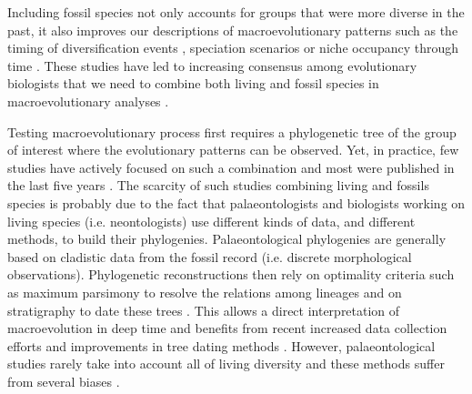 Including fossil species not only accounts for groups that were more diverse in the past, it also improves our descriptions of macroevolutionary patterns such as the timing of diversification events \citep[e.g. significantly reducing node age confidence intervals;][]{ronquista2012}, speciation scenarios \citep[e.g. revealing hidden vicariance patterns;][]{Wood01032013} or niche occupancy through time \citep[e.g.][]{pearmanniche2008}.
These studies have led to increasing consensus among evolutionary biologists that we need to combine both living and fossil species in macroevolutionary analyses \citep{jacksonwhat2006,quentaldiversity2010,dietlconservation2011,slaterunifying2013,fritzdiversity2013,benton2015}.


Testing macroevolutionary process first requires a phylogenetic tree of the group of interest where the evolutionary patterns can be observed.
Yet, in practice, few studies have actively focused on such a combination and most were published in the last five years \citep[e.g.][]{ronquista2012,slaterphylogenetic2013,Wood01032013,beckancient2014}.
The scarcity of such studies combining living and fossils species is probably due to the fact that palaeontologists and biologists working on living species (i.e. neontologists) %
use different kinds of data, and different methods, to build their phylogenies.
Palaeontological phylogenies are generally based on cladistic data from the fossil record (i.e. discrete morphological observations).
Phylogenetic reconstructions then rely on optimality criteria such as maximum parsimony \citep{Hennig1966,felsenstein2004} to resolve the relations among lineages and on stratigraphy to date these trees \citep{GoloboffTNT}.
This allows a direct interpretation of macroevolution in deep time and benefits from recent increased data collection efforts \citep[e.g. 4541 characters in][introducing the term ``phenomics'']{O'Leary08022013} and improvements in tree dating methods \citep[e.g. the \textit{cal3} method from][]{Bapst2014}.
However, palaeontological studies rarely take into account all of living diversity \citep[e.g. only 38 out of 351 living primates are included with 119 fossils in][]{ni2013oldest} and these methods suffer from several biases \citep[e.g. parsimony;][]{wrightbayesian2014}. %

